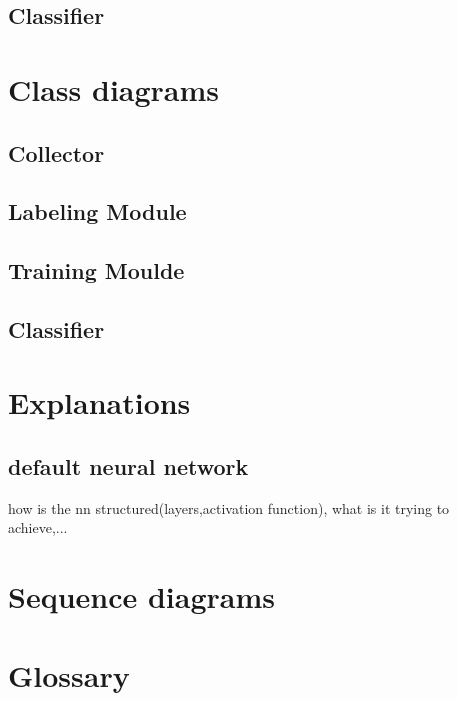 \documentclass[parskip=full]{scrartcl}
\begin{document}
\subsection{Classifier}


\section{Class diagrams}

\subsection{Collector}
\subsection{Labeling Module}
\subsection{Training Moulde}
\subsection{Classifier}


\section{Explanations}
\subsection{default neural network}
how is the nn structured(layers,activation function), what is it trying to achieve,...


\section{Sequence diagrams}

\section{Glossary}

%
\printnoidxglossaries
\end{document}
